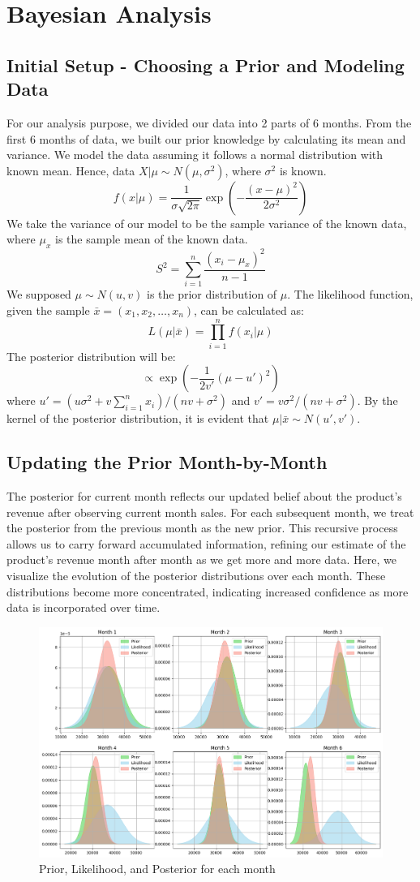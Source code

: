\section{Bayesian Analysis}

\subsection{Initial Setup - Choosing a Prior and Modeling Data}
For our analysis purpose, we divided our data into 2 parts of 6 months.
From the first 6 months of data, we built our prior knowledge by calculating its mean and variance.
We model the data assuming it follows a normal distribution with known mean.
Hence, data $X | \mu \sim N(\mu, \sigma^2)$, where $\sigma^2$ is known.
$$ f(x | \mu) = \frac{1}{\sigma \sqrt{2\pi}} \exp\left(-\frac{(x - \mu)^2}{2\sigma^2}\right) $$
We take the variance of our model to be the sample variance of the known data, where $\mu_x$ is the sample mean of the known data.
        $$ S^2 = \sum_{i = 1}^{n} \frac{(x_i - \mu_x)^2}{n - 1} $$
We supposed $\mu \sim N(u, v)$ is the prior distribution of $\mu$.
The likelihood function, given the sample $\bar{x} = (x_1, x_2, \dots, x_n)$, can be calculated as: $$ L(\mu | \bar{x}) = \prod_{i = 1}^{n} f(x_i | \mu)$$
The posterior distribution will be: $$ \propto \exp\left(-\frac{1}{2v'} (\mu - u')^2\right)$$
where $u' = \left(u \sigma^2 + v \sum_{i = 1}^{n} x_i\right) / (n v + \sigma^2)$ and $v' = v \sigma^2/(n v + \sigma^2)$.
By the kernel of the posterior distribution, it is evident that $\mu | \bar{x} \sim N(u', v')$.



\subsection{Updating the Prior Month-by-Month}

    The posterior for current month reflects our updated belief about the product's revenue after observing current month sales.
    For each subsequent month, we treat the posterior from the previous month as the new prior.
    This recursive process allows us to carry forward accumulated information, refining our estimate of the product's revenue month after month as we get more and more data.
Here, we visualize the evolution of the posterior distributions over each month.
These distributions become more concentrated, indicating increased confidence as more data is incorporated over time.
\begin{figure}[!ht]
  \centering
  \includegraphics[width=.6\textwidth]{images/months.png}
  \caption{Prior, Likelihood, and Posterior for each month}
\end{figure}


